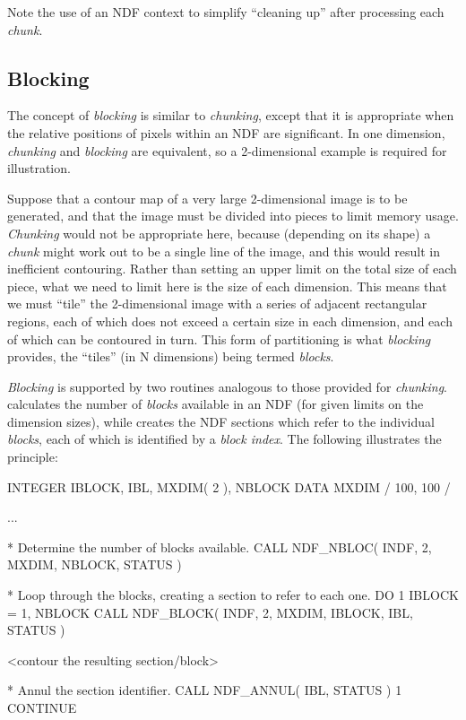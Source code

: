 \documentclass[twoside,11pt,nolof]{starlink}
\providecommand{\st}[1]{{\emph{#1}}}
\begin{document}
Note the use of an NDF context to simplify ``cleaning up'' after processing
each \st{chunk}.


\subsection{Blocking}

The concept of \st{blocking\/} is similar to \st{chunking}, except
that it is appropriate when the relative positions of pixels within an
NDF are significant. In one dimension, \st{chunking\/} and
\st{blocking\/} are equivalent, so a 2-dimensional example is required
for
illustration.

Suppose that a contour map of a very large \mbox{2-dimensional} image is
to be generated, and that the image must be divided into pieces to limit
memory usage. \st{Chunking\/} would not be appropriate here, because
(depending on its shape) a \st{chunk\/} might work out to be a single
line of the image, and this would result in inefficient contouring.
Rather than setting an upper limit on the total size of each piece, what
we need to limit here is the size of each dimension. This means
that we must ``tile'' the 2-dimensional image with a series of adjacent
rectangular regions, each of which does not exceed a certain size in
each dimension, and each of which can be contoured in turn. This form of
partitioning is what \st{blocking\/} provides, the ``tiles'' (in N
dimensions) being termed \st{blocks}.

\st{Blocking\/} is supported by two routines analogous to those
provided for \st{chunking}.  calculates
the number of \st{blocks\/} available in an NDF (for given limits on
the dimension sizes),
while  creates the NDF sections which refer to the individual
\st{blocks}, each of which is identified by a \st{block index}. The
following illustrates the principle:

\small
\begin{terminalv}
      INTEGER IBLOCK, IBL, MXDIM( 2 ), NBLOCK
      DATA MXDIM / 100, 100 /

      ...

*  Determine the number of blocks available.
      CALL NDF_NBLOC( INDF, 2, MXDIM, NBLOCK, STATUS )

*  Loop through the blocks, creating a section to refer to each one.
      DO 1 IBLOCK = 1, NBLOCK
         CALL NDF_BLOCK( INDF, 2, MXDIM, IBLOCK, IBL, STATUS )

         <contour the resulting section/block>

*  Annul the section identifier.
         CALL NDF_ANNUL( IBL, STATUS )
 1    CONTINUE
\end{terminalv}
\normalsize
\end{document}
